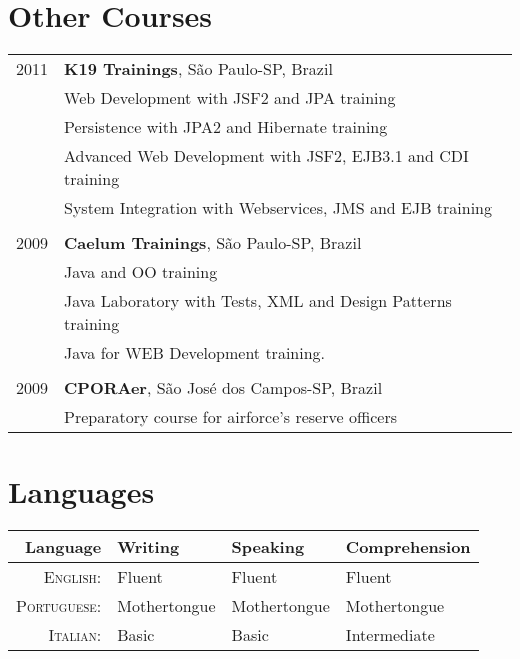 \documentclass[a4paper,10pt]{article} %
\begin{document}
\section{Other Courses}

\begin{tabular}{r|p{11cm}}
2011 & \textbf{K19 Trainings}, S\~ao Paulo-SP, Brazil\\
    & \footnotesize{Web Development with JSF2 and JPA} training\\
    & \footnotesize{Persistence with JPA2 and Hibernate} training\\
    & \footnotesize{Advanced Web Development with JSF2, EJB3.1 and CDI} training\\
    & \footnotesize{System Integration with Webservices, JMS and EJB} training\\
    \multicolumn{2}{c}{}\\
    
2009 & \textbf{Caelum Trainings}, S\~{a}o Paulo-SP, Brazil\\
    & \footnotesize{Java and OO} training\\
    & \footnotesize{Java Laboratory with Tests, XML and Design Patterns} training\\
    & \footnotesize{Java for WEB Development} training.\\
    \multicolumn{2}{c}{}\\

2009 & \textbf{CPORAer}, São José dos Campos-SP, Brazil\\
    & \footnotesize{Preparatory course for airforce's reserve officers}\\

\end{tabular}


\section{Languages}

\begin{tabular}{r|lll}
Language &  Writing & Speaking & Comprehension \\
\hline
\textsc{English:} & Fluent & Fluent & Fluent \\ 

\textsc{Portuguese:} & Mothertongue & Mothertongue & Mothertongue \\

\textsc{Italian:} & Basic & Basic & Intermediate\\
\end{tabular}
\end{document}
